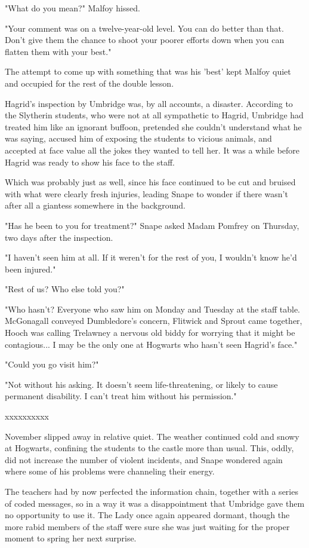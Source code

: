 \documentclass[a4paper,11pt]{article}
\begin{document}
"What do you mean?" Malfoy hissed.

"Your comment was on a twelve-year-old level. You can do better than that. Don't give them the chance to shoot your poorer efforts down when you can flatten them with your best."

The attempt to come up with something that was his 'best' kept Malfoy quiet and occupied for the rest of the double lesson.

Hagrid's inspection by Umbridge was, by all accounts, a disaster. According to the Slytherin students, who were not at all sympathetic to Hagrid, Umbridge had treated him like an ignorant buffoon, pretended she couldn't understand what he was saying, accused him of exposing the students to vicious animals, and accepted at face value all the jokes they wanted to tell her. It was a while before Hagrid was ready to show his face to the staff.

Which was probably just as well, since his face continued to be cut and bruised with what were clearly fresh injuries, leading Snape to wonder if there wasn't after all a giantess somewhere in the background.

"Has he been to you for treatment?" Snape asked Madam Pomfrey on Thursday, two days after the inspection.

"I haven't seen him at all. If it weren't for the rest of you, I wouldn't know he'd been injured."

"Rest of us? Who else told you?"

"Who hasn't? Everyone who saw him on Monday and Tuesday at the staff table. McGonagall conveyed Dumbledore's concern, Flitwick and Sprout came together, Hooch was calling Trelawney a nervous old biddy for worrying that it might be contagious... I may be the only one at Hogwarts who hasn't seen Hagrid's face."

"Could you go visit him?"

"Not without his asking. It doesn't seem life-threatening, or likely to cause permanent disability. I can't treat him without his permission."

xxxxxxxxxx

November slipped away in relative quiet. The weather continued cold and snowy at Hogwarts, confining the students to the castle more than usual. This, oddly, did not increase the number of violent incidents, and Snape wondered again where some of his problems were channeling their energy.

The teachers had by now perfected the information chain, together with a series of coded messages, so in a way it was a disappointment that Umbridge gave them no opportunity to use it. The Lady once again appeared dormant, though the more rabid members of the staff were sure she was just waiting for the proper moment to spring her next surprise.
\end{document}
